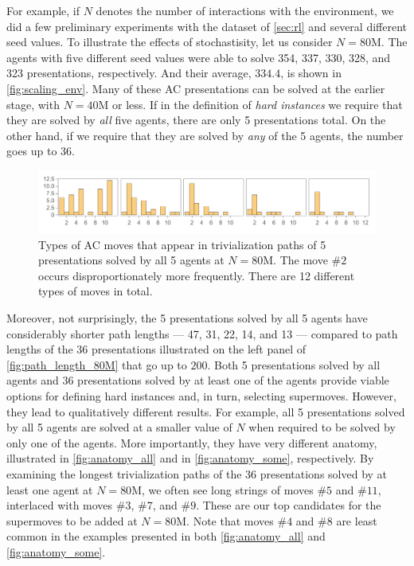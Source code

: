 For example, if $N$ denotes the number of interactions with the environment, we did a few preliminary experiments with the dataset of \autoref{sec:rl} and several different seed values. To illustrate the effects of stochastisity, let us consider $N=80$M. The agents with five different seed values were able to solve 354, 337, 330, 328, and 323 presentations, respectively. And their average, $334.4$, is shown in \autoref{fig:scaling_env}. Many of these AC presentations can be solved at the earlier stage, with $N=40$M or less. If in the definition of \textit{hard instances} we require that they are solved by \textit{all} five agents, there are only 5 presentations total. On the other hand, if we require that they are solved by \textit{any} of the 5 agents, the number goes up to 36.

\begin{figure}[h]
    \centering
	\includegraphics[scale=0.6]{fig/anatomy_all.png}
	\caption{Types of AC moves that appear in trivialization paths of 5 presentations solved by all 5 agents at $N=80$M. The move $\# 2$ occurs disproportionately more frequently. There are 12 different types of moves in total.}
	\label{fig:anatomy_all}
\end{figure}

Moreover, not surprisingly, the 5 presentations solved by all 5 agents have considerably shorter path lengths --- 47, 31, 22, 14, and 13 --- compared to path lengths of the 36 presentations illustrated on the left panel of \autoref{fig:path_length_80M} that go up to $200$. Both 5 presentations solved by all agents and 36 presentations solved by at least one of the agents provide viable options for defining hard instances and, in turn, selecting supermoves. However, they lead to qualitatively different results. For example, all 5 presentations solved by all 5 agents are solved at a smaller value of $N$ when required to be solved by only one of the agents. More importantly, they have very different anatomy, illustrated in \autoref{fig:anatomy_all} and in \autoref{fig:anatomy_some}, respectively.
%
By examining the longest trivialization paths of the 36 presentations solved by at least one agent at $N=80$M, we often see long strings of moves $\# 5$ and $\# 11$, interlaced with moves $\# 3$, $\# 7$, and $\# 9$. These are our top candidates for the supermoves to be added at $N=80$M.
%
Note that moves $\# 4$ and $\# 8$ are least common in the examples presented in both \autoref{fig:anatomy_all} and \autoref{fig:anatomy_some}.

